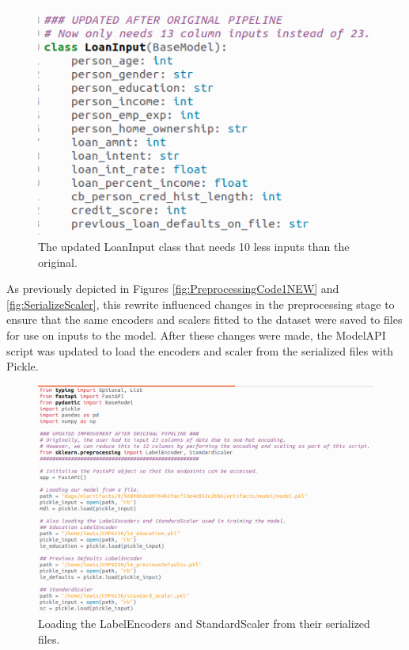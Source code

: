 \documentclass[12pt]{report}
\begin{document}
\begin{figure}[H]
    \centering
    \includegraphics[width=\linewidth]{Implementation/JAN 10 UPDATES/NewLoanInput.png}
    \caption{The updated LoanInput class that needs 10 less inputs than the original.}
    \label{fig:NewLoanInput}
\end{figure}

\noindent As previously depicted in Figures \ref{fig:PreprocessingCode1NEW} and \ref{fig:SerializeScaler}, this rewrite influenced changes in 
the preprocessing stage to ensure that the same encoders and scalers fitted to the dataset were saved to files for use on inputs to the model.
After these changes were made, the ModelAPI script was updated to load the encoders and scaler from the serialized files with Pickle.

\begin{figure}[H]
    \centering
    \includegraphics[width=\linewidth]{Implementation/JAN 10 UPDATES/LoadFiles.png}
    \caption{Loading the LabelEncoders and StandardScaler from their serialized files.}
    \label{fig:UviLoadFiles}
\end{figure}
\end{document}
